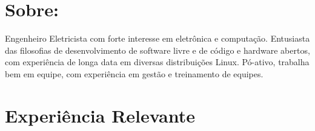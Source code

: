\documentclass[a4paper]{twentysecondcv} %
\begin{document}
\makeprofile %
 
\section{Sobre: }
\small{Engenheiro Eletricista com forte interesse em eletrônica e computação. 
Entusiasta das filosofias de desenvolvimento de software livre e de código e 
hardware abertos, com experiência de longa data em diversas distribuições Linux. 
Pó-ativo, trabalha bem em equipe, com experiência em gestão e treinamento de 
equipes.}

\section{Experiência Relevante}
\end{document}
